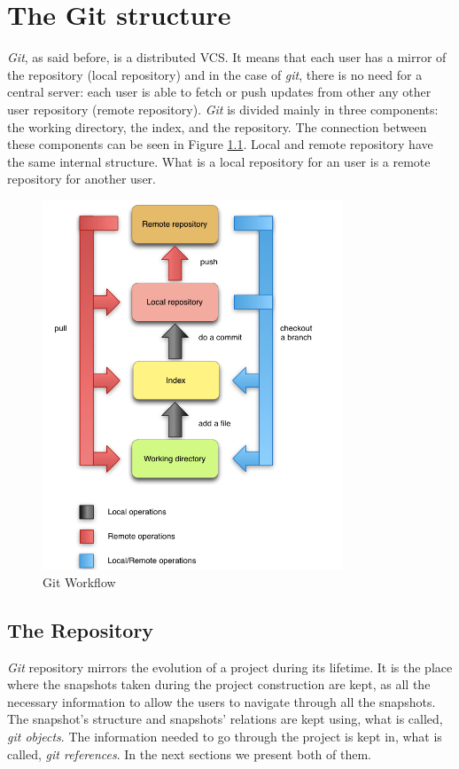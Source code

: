 \chapter{The Git structure}
\emph{Git}, as said before, is a distributed VCS.
It means that each user has a mirror of the repository (local
repository) and in the case of
\emph{git}, there is no need for a central server: each user is able to
fetch or push updates from other any other user repository (remote repository).
\emph{Git} is divided mainly in three components: the working directory,
the index, and the repository. The connection between these components
can be seen in Figure \ref{fig:git_structure}. Local and remote
repository have the same internal structure. What is a local
repository for an user is a remote repository for another user.

\begin{figure}[thp]
   \centering
   \includegraphics[width=0.8\textwidth]{images/git_workflow.png}
   \caption{Git Workflow}\label{fig:git_structure}
\end{figure}

\pagebreak

\section{The Repository}
\emph{Git} repository mirrors the evolution of a project during its lifetime. It is
the place where the snapshots taken during the project construction
are kept, as all the necessary information to
allow the users to navigate through all the snapshots. The snapshot's
structure and snapshots' relations are kept using, what is called, \emph{git
objects}. The information needed to go through the project is kept in,
what is called, \emph{git references}. In the next sections we
present both of them.


